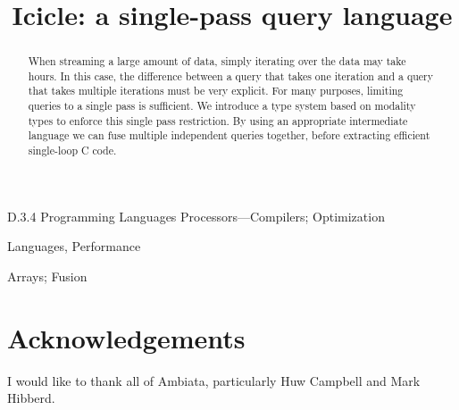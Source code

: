\documentclass[preprint]{sigplanconf}
\begin{document}
\doi{}

\title{Icicle: a single-pass query language}


\maketitle
\makeatactive

\begin{abstract}
When streaming a large amount of data, simply iterating over the data may take hours.
In this case, the difference between a query that takes one iteration and a query that takes multiple iterations must be very explicit.
For many purposes, limiting queries to a single pass is sufficient.
We introduce a type system based on modality types to enforce this single pass restriction.
By using an appropriate intermediate language we can fuse multiple independent queries together, before extracting efficient single-loop C code.
\end{abstract}


\category
	{D.3.4}
	{Programming Languages}
	{Processors---Compilers; Optimization}

\terms
	Languages, Performance

\keywords
	Arrays; Fusion








\section*{Acknowledgements}
I would like to thank all of Ambiata, particularly Huw Campbell and Mark Hibberd.



\end{document}
